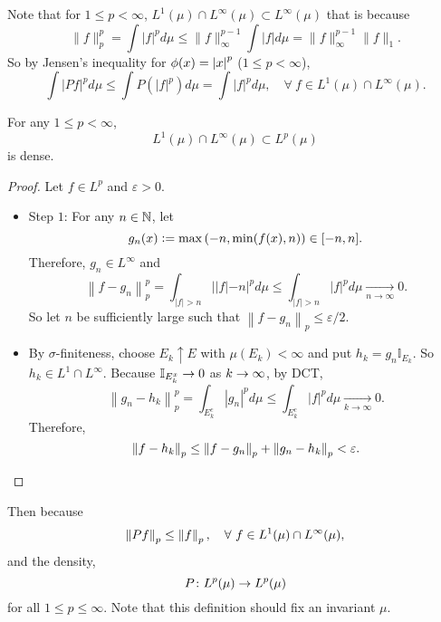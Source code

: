 \noindent Note that for $1 \leq p < \infty$, $L^1(\mu) \cap L^\infty(\mu) \subset L^\infty(\mu)$ that is because
\begin{equation*}
	\|f\|_p^p=\int|f|^p d \mu \leq\|f\|_{\infty}^{p-1} \int|f| d \mu=\|f\|_{\infty}^{p-1}\|f\|_1.
\end{equation*}
So by Jensen's inequality for $\phi(x) = \left\lvert x\right\lvert^p$ ($1 \leq p <\infty$),
\begin{equation*}
	\int|P f|^p d \mu \leq \int P\left(|f|^p\right) d \mu=\int|f|^p d \mu,\quad \forall~ f \in L^1(\mu) \cap L^\infty(\mu).
\end{equation*}
\begin{lem}
    For any $1 \leq p < \infty$,
    \begin{equation*}
    	L^1(\mu) \cap L^\infty(\mu) \subset L^p(\mu)
    \end{equation*}
    is dense.
\end{lem}
\begin{proof}
	Let $f \in L^p$ and $\varepsilon > 0$.
	\begin{itemize}
	    \item Step $1$: For any $n \in \mathbb{N}$, let 
	    \begin{equation*}
	    	g_n(x) \vcentcolon= \max\left(-n,\min(f(x),n)\right) \in [-n,n].
	    \end{equation*}
	    Therefore, $g_n \in L^\infty$ and
	    \begin{equation*}
	    	\left\|f-g_n\right\|_p^p=\int_{|f|>n}| | f|-n|^p d \mu \leq \int_{|f|>n}|f|^p d \mu \underset{n \rightarrow \infty}{\longrightarrow} 0.
	    \end{equation*}
	    So let $n$ be sufficiently large such that $\left\|f-g_n\right\|_p \leq \varepsilon /2$.

	    \item By $\sigma$-finiteness, choose $E_k \uparrow E$ with $\mu(E_k) < \infty$ and put $h_k = g_n\mathbb{I}_{E_k}$. So $h_k \in L^1 \cap L^\infty$. Because $\mathbb{I}_{E_k^x} \rightarrow 0$ as $k\rightarrow \infty$, by DCT,
	    \begin{equation*}
	    	\left\|g_n-h_k\right\|_p^p=\int_{E_k^c}\left|g_n\right|^p d \mu \leq \int_{E_k^c}|f|^p d \mu \underset{k \rightarrow \infty}{\longrightarrow} 0.
	    \end{equation*}
	    Therefore,
	    \begin{equation*}
	    	\left\|f-h_k\right\|_p \leq\left\|f-g_n\right\|_p+\left\|g_n-h_k\right\|_p<\varepsilon. \qedhere
	    \end{equation*}
	\end{itemize}
\end{proof}
Then because
\begin{equation*}
	\left\lVert Pf\right\lVert_p \leq \left\lVert f\right\lVert_p,\quad \forall~ f \in L^1(\mu) \cap L^\infty(\mu),
\end{equation*}
and the density,
\begin{equation*}
	P \colon L^p(\mu) \rightarrow L^p(\mu)
\end{equation*}
for all $1 \leq p \leq \infty$. Note that this definition should fix an invariant $\mu$.

